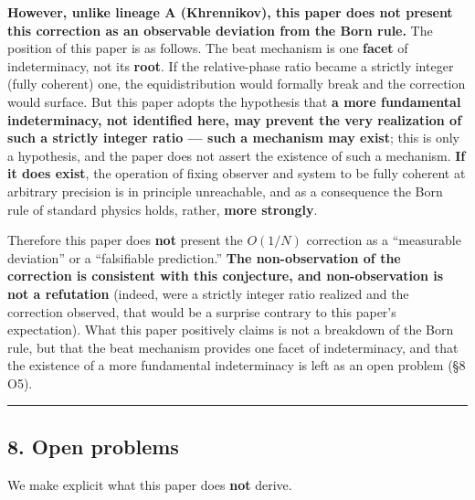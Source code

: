 \documentclass[
]{ltjsarticle}
\begin{document}
\textbf{However, unlike lineage A (Khrennikov), this paper does not
present this correction as an observable deviation from the Born rule.}
The position of this paper is as follows. The beat mechanism is one
\textbf{facet} of indeterminacy, not its \textbf{root}. If the
relative-phase ratio became a strictly integer (fully coherent) one, the
equidistribution would formally break and the correction would surface.
But this paper adopts the hypothesis that \textbf{a more fundamental
indeterminacy, not identified here, may prevent the very realization of
such a strictly integer ratio --- such a mechanism may exist}; this is
only a hypothesis, and the paper does not assert the existence of such a
mechanism. \textbf{If it does exist}, the operation of fixing observer
and system to be fully coherent at arbitrary precision is in principle
unreachable, and as a consequence the Born rule of standard physics
holds, rather, \textbf{more strongly}.

Therefore this paper does \textbf{not} present the \(O(1/N)\) correction
as a ``measurable deviation'' or a ``falsifiable prediction.''
\textbf{The non-observation of the correction is consistent with this
conjecture, and non-observation is not a refutation} (indeed, were a
strictly integer ratio realized and the correction observed, that would
be a surprise contrary to this paper's expectation). What this paper
positively claims is not a breakdown of the Born rule, but that the beat
mechanism provides one facet of indeterminacy, and that the existence of
a more fundamental indeterminacy is left as an open problem (§8 O5).

\begin{center}\rule{0.5\linewidth}{0.5pt}\end{center}

\subsection{8. Open problems}\label{open-problems}

We make explicit what this paper does \textbf{not} derive.
\end{document}
